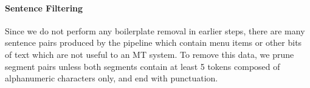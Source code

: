
\paragraph{Sentence Filtering}
Since we do not perform any boilerplate removal in earlier steps, there are many
sentence pairs produced by the pipeline which contain menu items or other bits
of text which are not useful to an MT system. To remove this data, we prune
segment pairs unless both segments contain at least 5 tokens composed of
alphanumeric characters only, and end with punctuation.
